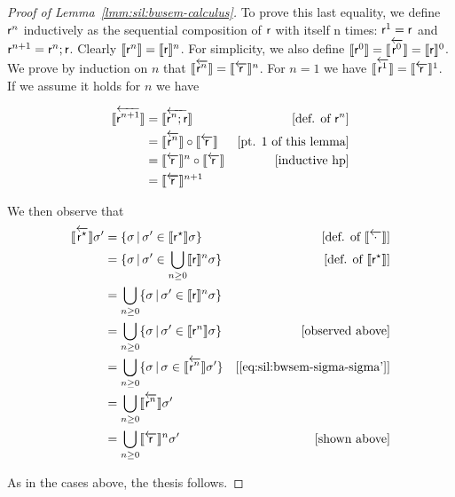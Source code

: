\begin{proof}[Proof of Lemma~\ref{lmm:sil:bwsem-calculus}]
	\proofcase{$\bwsem{{\regr^\kstar}}$}
	To prove this last equality, we define $\mathsf{r}^n$ inductively as the sequential composition of $\mathsf{r}$ with itself n times: $\mathsf{r}^1 = \mathsf{r}$ and $\mathsf{r}^{n+1} = \mathsf{r}^n; \mathsf{r}$. Clearly $\llbracket\mathsf{r}^n\rrbracket =\llbracket\mathsf{r}\rrbracket^n$. For simplicity, we also define $\llbracket\mathsf{r}^0\rrbracket = \llbracket\overleftarrow{\mathsf{r}^0}\rrbracket = \llbracket\mathsf{r}\rrbracket^0$. We prove by induction on $n$ that $\llbracket\overleftarrow{\mathsf{r}^n}\rrbracket = \llbracket\overleftarrow{\mathsf{r}}\rrbracket^n$.
	For $n = 1$ we have $\llbracket\overleftarrow{\mathsf{r}^1}\rrbracket = \llbracket\overleftarrow{\mathsf{r}}\rrbracket^1$. If we assume it holds for $n$ we have

	\begin{align*}
		\llbracket\overleftarrow{\mathsf{r}^{n+1}}\rrbracket & = \llbracket\overleftarrow{\mathsf{r}^n; \mathsf{r}}\rrbracket              & [\text{def. of }\mathsf{r}^n]     \\
		                    & = \llbracket\overleftarrow{\mathsf{r}^n}\rrbracket \circ \llbracket\overleftarrow{\mathsf{r}}\rrbracket & [\text{pt. 1 of this lemma}] \\
		                    & = \llbracket\overleftarrow{\mathsf{r}}\rrbracket^n \circ \llbracket\overleftarrow{\mathsf{r}}\rrbracket & [\text{inductive hp}]        \\
		                    & = \llbracket\overleftarrow{\mathsf{r}}\rrbracket^{n+1}
	\end{align*}

	We then observe that
	\begin{align*}
		\llbracket\overleftarrow{\mathsf{r}^\star}\rrbracket \sigma' & = \{ \sigma \,\vert\, \sigma' \in \llbracket\mathsf{r}^\star\rrbracket \sigma \}                     & [\text{def. of } \llbracket\overleftarrow{\cdot}\rrbracket]        \\
		                             & = \{ \sigma \,\vert\, \sigma' \in \bigcup\limits_{n \ge 0} \llbracket\mathsf{r}\rrbracket^n \sigma \} & [\text{def. of } \llbracket\mathsf{r}^\star\rrbracket] \\
		                             & = \bigcup\limits_{n \ge 0} \{ \sigma \,\vert\, \sigma' \in \llbracket\mathsf{r}\rrbracket^n \sigma \} &                                        \\
		                             & = \bigcup\limits_{n \ge 0} \{ \sigma \,\vert\, \sigma' \in \llbracket\mathsf{r}^n\rrbracket \sigma \} & [\text{observed above}]                \\
		                             & = \bigcup\limits_{n \ge 0} \{ \sigma \,\vert\, \sigma \in \llbracket\overleftarrow{\mathsf{r}^n}\rrbracket \sigma' \} & [\eqref{eq:sil:bwsem-sigma-sigma'}]    \\
		                             & = \bigcup\limits_{n \ge 0} \llbracket\overleftarrow{\mathsf{r}^n}\rrbracket \sigma'                                                                         \\
		                             & = \bigcup\limits_{n \ge 0} \llbracket\overleftarrow{\mathsf{r}}\rrbracket^n \sigma'                                & [\text{shown above}]
	\end{align*}

	As in the cases above, the thesis follows.
\end{proof}

